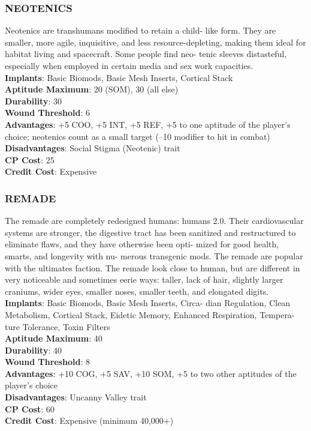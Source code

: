\subsubsection{NEOTENICS}
Neotenics are transhumans modified to retain a child-
like form. They are smaller, more agile, inquisitive,
and less resource-depleting, making them ideal for
habitat living and spacecraft. Some people find neo-
tenic sleeves distasteful, especially when employed in
certain media and sex work capacities.
\\ \textbf{Implants}: Basic Biomods, Basic Mesh Inserts, Cortical
Stack
\\ \textbf{Aptitude Maximum}: 20 (SOM), 30 (all else)
\\ \textbf{Durability}: 30
\\ \textbf{Wound Threshold}: 6
\\ \textbf{Advantages}: +5 COO, +5 INT, +5 REF, +5 to one
aptitude of the player’s choice; neotenics count as a
small target (–10 modifier to hit in combat)
\\ \textbf{Disadvantages}: Social Stigma (Neotenic) trait
\\ \textbf{CP Cost}: 25
\\ \textbf{Credit Cost}: Expensive

\subsubsection{REMADE}
The remade are completely redesigned humans:
humans 2.0. Their cardiovascular systems are stronger,
the digestive tract has been sanitized and restructured
to eliminate flaws, and they have otherwise been opti-
mized for good health, smarts, and longevity with nu-
merous transgenic mods. The remade are popular with
the ultimates faction. The remade look close to human,
but are different in very noticeable and sometimes eerie
ways: taller, lack of hair, slightly larger craniums, wider
eyes, smaller noses, smaller teeth, and elongated digits.
\\ \textbf{Implants}: Basic Biomods, Basic Mesh Inserts, Circa-
dian Regulation, Clean Metabolism, Cortical Stack,
Eidetic Memory, Enhanced Respiration, Tempera-
ture Tolerance, Toxin Filters
\\ \textbf{Aptitude Maximum}: 40
\\ \textbf{Durability}: 40
\\ \textbf{Wound Threshold}: 8
\\ \textbf{Advantages}: +10 COG, +5 SAV, +10 SOM, +5 to two
other aptitudes of the player’s choice
\\ \textbf{Disadvantages}: Uncanny Valley trait
\\ \textbf{CP Cost}: 60
\\ \textbf{Credit Cost}: Expensive (minimum 40,000+)

